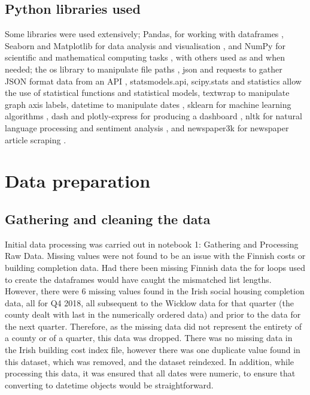 \documentclass[hidelinks,12pt,oneside]{report} %
\begin{document}
\subsection{Python libraries used}
Some libraries were used extensively; Pandas, for working with dataframes \citep{pandas}, Seaborn and Matplotlib for data analysis and visualisation \citep{seaborn, matplotlib}, and NumPy for scientific and mathematical computing tasks \citep{numpy}, with others used as and when needed; the os library to manipulate file paths \citep{os}, json and requests to gather JSON format data from an API \citep{requests, json},  statsmodels.api, scipy.stats and statistics \citep{statsmodels, scipystats, statistics} allow the use of statistical functions and statistical models, textwrap \citep{textwrap} to manipulate graph axis labels, datetime to manipulate dates \citep{datetime}, sklearn for machine learning algorithms \citep{sklearn}, dash and plotly-express for producing a dashboard \citep{dash, plotly}, nltk for natural language processing and sentiment analysis \citep{nltk}, and newspaper3k for newspaper article scraping \citep{newspaper3k, gfgnews}.

\section{Data preparation}
\subsection{Gathering and cleaning the data}
Initial data processing was carried out in notebook 1: Gathering and Processing Raw Data. Missing values were not found to be an issue with the  Finnish costs or building completion data. Had there been missing Finnish data the for loops used to create the dataframes would have caught the mismatched list lengths. However, there were 6 missing values found in the Irish social housing completion data, all for Q4 2018, all subsequent to the Wicklow data for that quarter (the county dealt with last in the numerically ordered data) and prior to the data for the next quarter.  Therefore, as the missing data did not represent the entirety of a county or of a quarter, this data was dropped. There was no missing data in the Irish building cost index file, however there was one duplicate value found in this dataset, which was removed, and the dataset reindexed. In addition, while processing this data, it was ensured that all dates were numeric, to ensure that converting to datetime objects would be straightforward.
\end{document}
